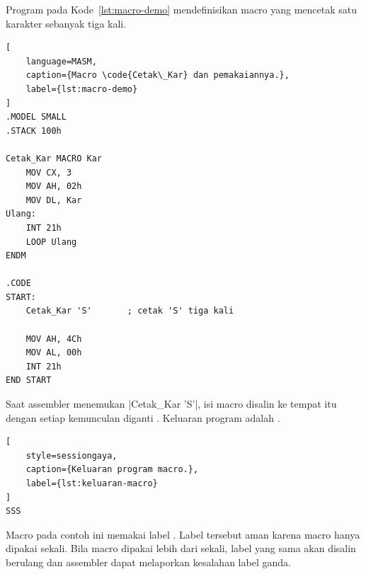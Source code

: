 Program pada Kode~\ref{lst:macro-demo} mendefinisikan macro
 yang mencetak satu karakter sebanyak tiga kali.

\begin{lstlisting}[
    language=MASM,
    caption={Macro \code{Cetak\_Kar} dan pemakaiannya.},
    label={lst:macro-demo}
]
.MODEL SMALL
.STACK 100h

Cetak_Kar MACRO Kar
    MOV CX, 3
    MOV AH, 02h
    MOV DL, Kar
Ulang:
    INT 21h
    LOOP Ulang
ENDM

.CODE
START:
    Cetak_Kar 'S'       ; cetak 'S' tiga kali

    MOV AH, 4Ch
    MOV AL, 00h
    INT 21h
END START
\end{lstlisting}

Saat assembler menemukan \lstasm|Cetak_Kar 'S'|, isi macro disalin ke
tempat itu dengan setiap kemunculan  diganti .
Keluaran program adalah .

\begin{lstlisting}[
    style=sessiongaya,
    caption={Keluaran program macro.},
    label={lst:keluaran-macro}
]
SSS
\end{lstlisting}

\begin{infobox}
\vspace{1.1em}
Macro pada contoh ini memakai label . Label tersebut
aman karena macro hanya dipakai sekali. Bila macro dipakai lebih dari
sekali, label yang sama akan disalin berulang dan assembler dapat
melaporkan kesalahan label ganda.
\end{infobox}

